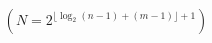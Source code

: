 \documentclass[preview]{standalone}
\begin{document}
\begin{align*}
(N=2^{\lfloor\log_{2}{(n-1)+(m-1)\rfloor+1}})
\end{align*}
\end{document}
